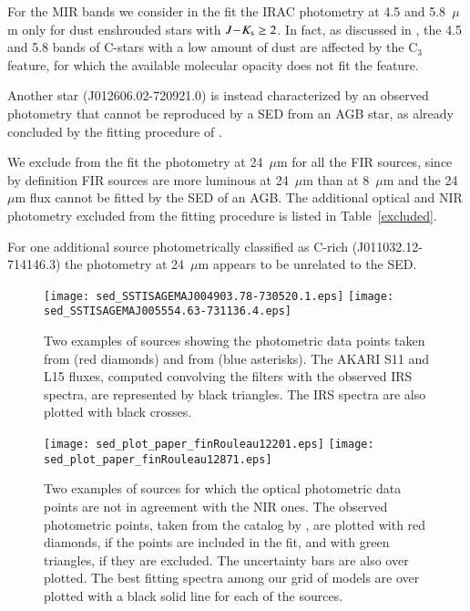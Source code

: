 \documentclass[useAMS,usenatbib]{mn2e/mn2e}
\newcommand{\jks}{\mbox{$J\!-\!K_{\rm s}$}}
\begin{document}
{For the MIR bands we consider in the fit the IRAC photometry at 4.5 and 5.8~$\mu$m only for dust enshrouded stars with $\jks\ge 2$.
In fact, as discussed in \citet{Nanni16}, the 4.5 and 5.8 bands of C-stars with a low amount of dust are affected by the C$_3$ feature, for which the available molecular opacity does not fit the feature. 

Another star (J012606.02-720921.0) is instead characterized by an observed photometry that cannot be reproduced by a SED from an AGB star, as already concluded by the fitting procedure of \citet{Srinivasan16}.


We exclude from the fit the photometry at 24~$\mu$m for all the FIR sources, since by definition FIR sources are more luminous at 24~$\mu$m than at 8~$\mu$m and the 24~$\mu$m flux cannot be fitted by the SED of an AGB.
The additional optical and NIR photometry excluded from the fitting procedure is listed in Table~\ref{excluded}.

For one additional source photometrically classified as C-rich (J011032.12-714146.3) the photometry at 24~$\mu$m appears to be unrelated to the SED.

\begin{figure}
\texttt{[image: sed\_SSTISAGEMAJ004903.78-730520.1.eps]}
\texttt{[image: sed\_SSTISAGEMAJ005554.63-731136.4.eps]}
        \caption{Two examples of sources showing the photometric data points taken from \citet{Srinivasan16} (red diamonds) and from \citet{Ita10} (blue asterisks). The AKARI S11 and L15 fluxes, computed convolving the filters with the observed IRS spectra, are represented by black triangles. The IRS spectra are also plotted with black crosses.}
        \label{akari_opt_cfr}
        \end{figure}

\begin{figure}
\texttt{[image: sed\_plot\_paper\_finRouleau12201.eps]}
\texttt{[image: sed\_plot\_paper\_finRouleau12871.eps]}
\caption{Two examples of sources for which the optical photometric data points are not in agreement with the NIR ones. The observed photometric points, taken from the catalog by \citet{Srinivasan16}, are plotted with red diamonds, if the points are included in the fit, and with green triangles, if they are excluded. The uncertainty bars are also over plotted. The best fitting spectra among our grid of models are over plotted with a black solid line for each of the sources.}
        \label{opt_cfr}
        \end{figure}
        
}
\end{document}
